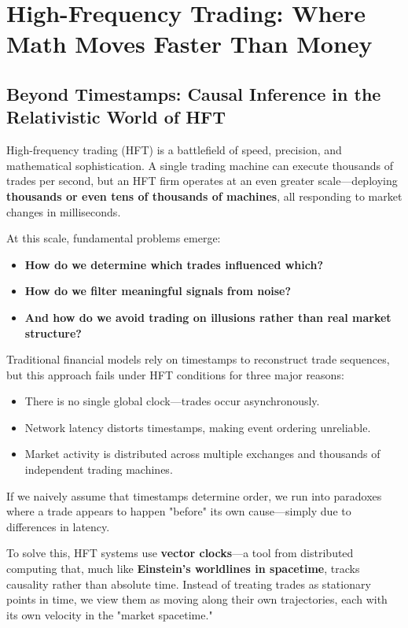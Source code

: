 \section{High-Frequency Trading: Where Math Moves Faster Than Money}

\subsection{Beyond Timestamps: Causal Inference in the Relativistic World of HFT}

High-frequency trading (HFT) is a battlefield of speed, precision, and mathematical sophistication. A single trading machine can execute thousands of trades per second, but an HFT firm operates at an even greater scale—deploying \textbf{thousands or even tens of thousands of machines}, all responding to market changes in milliseconds. 

At this scale, fundamental problems emerge: 

\begin{itemize}
    \item \textbf{How do we determine which trades influenced which?}
    \item \textbf{How do we filter meaningful signals from noise?}
    \item  \textbf{And how do we avoid trading on illusions rather than real market structure?} 
\end{itemize}


Traditional financial models rely on timestamps to reconstruct trade sequences, but this approach fails under HFT conditions for three major reasons:

\begin{itemize}
    \item There is no single global clock—trades occur asynchronously.
    \item Network latency distorts timestamps, making event ordering unreliable.
    \item Market activity is distributed across multiple exchanges and thousands of independent trading machines.
\end{itemize}

If we naively assume that timestamps determine order, we run into paradoxes where a trade appears to happen "before" its own cause—simply due to differences in latency.

To solve this, HFT systems use \textbf{vector clocks}—a tool from distributed computing that, much like \textbf{Einstein’s worldlines in spacetime}, tracks causality rather than absolute time. Instead of treating trades as stationary points in time, we view them as moving along their own trajectories, each with its own velocity in the "market spacetime."

